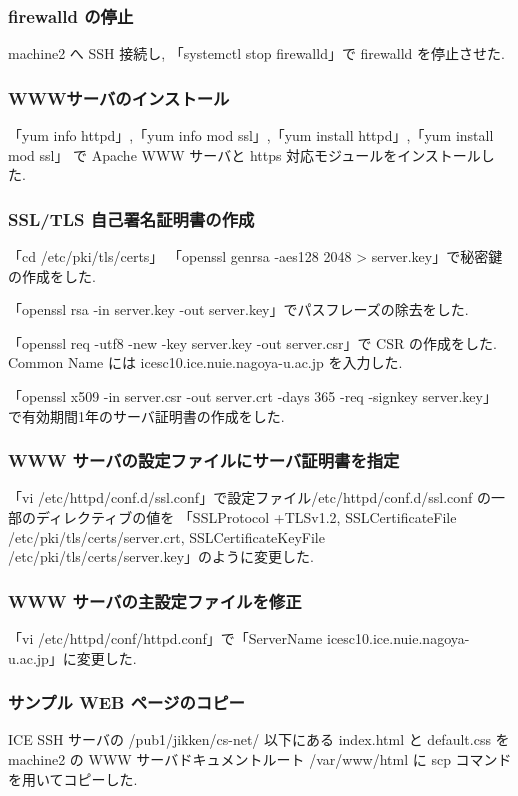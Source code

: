 \documentclass{ltjsarticle} %
\begin{document}
\subsubsection{firewalld の停止}
machine2 へ SSH 接続し, 「systemctl stop firewalld」で firewalld を停止させた. 

\subsubsection{WWWサーバのインストール}
「yum info httpd」,「yum info mod ssl」,「yum install httpd」,「yum install mod ssl」
で Apache WWW サーバと https 対応モジュールをインストールした. 

\subsubsection{SSL/TLS 自己署名証明書の作成}
「cd /etc/pki/tls/certs」
「openssl genrsa -aes128 2048 > server.key」で秘密鍵の作成をした. 

「openssl rsa -in server.key -out server.key」でパスフレーズの除去をした. 

「openssl req -utf8 -new -key server.key -out server.csr」で CSR の作成をした. 
Common Name には icesc10.ice.nuie.nagoya-u.ac.jp を入力した. 

「openssl x509 -in server.csr -out server.crt -days 365 -req -signkey server.key」
で有効期間1年のサーバ証明書の作成をした. 

\subsubsection{WWW サーバの設定ファイルにサーバ証明書を指定}
「vi /etc/httpd/conf.d/ssl.conf」で設定ファイル/etc/httpd/conf.d/ssl.conf の一部のディレクティブの値を
「SSLProtocol +TLSv1.2, SSLCertificateFile /etc/pki/tls/certs/server.crt, 
SSLCertificateKeyFile /etc/pki/tls/certs/server.key」のように変更した. 

\subsubsection{WWW サーバの主設定ファイルを修正}
「vi /etc/httpd/conf/httpd.conf」で「ServerName icesc10.ice.nuie.nagoya-u.ac.jp」に変更した. 

\subsubsection{サンプル WEB ページのコピー}
ICE SSH サーバの /pub1/jikken/cs-net/ 以下にある index.html と default.css を machine2 の
WWW サーバドキュメントルート /var/www/html に scp コマンドを用いてコピーした. 
\end{document}
